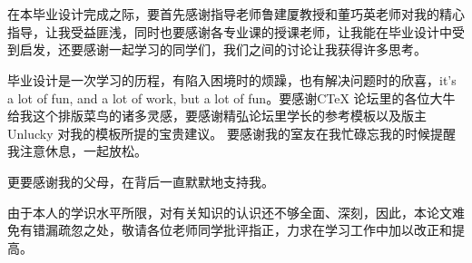\chapter{\acknowledgementtitle}

在本毕业设计完成之际，要首先感谢指导老师鲁建厦教授和董巧英老师对我的精心指导，让我受益匪浅，同时也要感谢各专业课的授课老师，让我能在毕业设计中受到启发，还要感谢一起学习的同学们，我们之间的讨论让我获得许多思考。
 
毕业设计是一次学习的历程，有陷入困境时的烦躁，也有解决问题时的欣喜，it's a lot of fun, and a lot of work, but a lot of fun。要感谢CTeX 论坛里的各位大牛给我这个排版菜鸟的诸多灵感，要感谢精弘论坛里学长的参考模板以及版主Unlucky 对我的模板所提的宝贵建议。
要感谢我的室友在我忙碌忘我的时候提醒我注意休息，一起放松。

更要感谢我的父母，在背后一直默默地支持我。

由于本人的学识水平所限，对有关知识的认识还不够全面、深刻，因此，本论文难免有错漏疏忽之处，敬请各位老师同学批评指正，力求在学习工作中加以改正和提高。